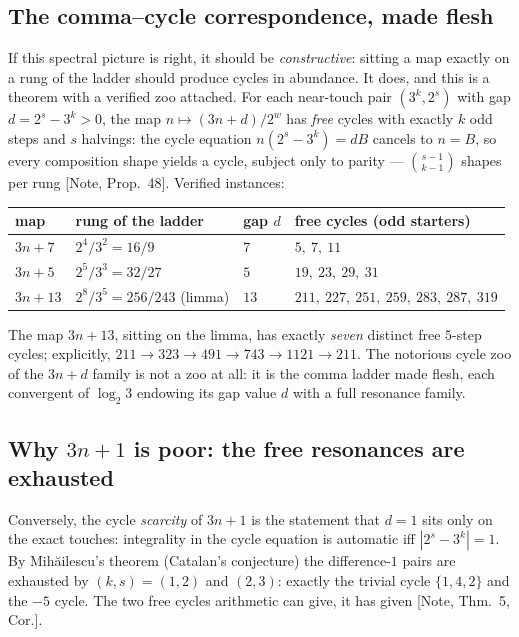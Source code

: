 \documentclass[11pt]{article}
\theoremstyle{definition}
\theoremstyle{remark}
\newcommand{\anchor}[1]{\textup{[#1]}}
\begin{document}
\subsection{The comma--cycle correspondence, made flesh}

If this spectral picture is right, it should be \emph{constructive}: sitting a
map exactly on a rung of the ladder should produce cycles in abundance. It
does, and this is a theorem with a verified zoo attached. For each near-touch
pair $(3^k, 2^s)$ with gap $d = 2^s - 3^k > 0$, the map $n \mapsto (3n+d)/2^w$
has \emph{free} cycles with exactly $k$ odd steps and $s$ halvings: the cycle
equation $n(2^s-3^k) = dB$ cancels to $n = B$, so every composition shape
yields a cycle, subject only to parity --- $\binom{s-1}{k-1}$ shapes per rung
\anchor{Note, Prop.~48}. Verified instances:

\begin{center}
\begin{tabular}{llll}
\toprule
map & rung of the ladder & gap $d$ & free cycles (odd starters) \\
\midrule
$3n+7$ & $2^4/3^2 = 16/9$ & $7$ & $5,\ 7,\ 11$ \\
$3n+5$ & $2^5/3^3 = 32/27$ & $5$ & $19,\ 23,\ 29,\ 31$ \\
$3n+13$ & $2^8/3^5 = 256/243$ (limma) & $13$ &
$211,\ 227,\ 251,\ 259,\ 283,\ 287,\ 319$ \\
\bottomrule
\end{tabular}
\end{center}

\noindent The map $3n+13$, sitting on the limma, has exactly \emph{seven}
distinct free $5$-step cycles; explicitly,
$211 \to 323 \to 491 \to 743 \to 1121 \to 211$. The notorious cycle zoo of the
$3n+d$ family is not a zoo at all: it is the comma ladder made flesh, each
convergent of $\log_2 3$ endowing its gap value $d$ with a full resonance
family.

\subsection{Why $3n+1$ is poor: the free resonances are exhausted}

Conversely, the cycle \emph{scarcity} of $3n+1$ is the statement that $d=1$
sits only on the exact touches: integrality in the cycle equation is automatic
iff $|2^{s} - 3^{k}| = 1$. By Mih\u{a}ilescu's theorem (Catalan's conjecture)
\cite{Mihailescu2004} the difference-$1$ pairs are exhausted by
$(k,s) = (1,2)$ and $(2,3)$: exactly the trivial cycle $\{1,4,2\}$ and the
$-5$ cycle. The two free cycles arithmetic can give, it has given
\anchor{Note, Thm.~5, Cor.}.
\end{document}
